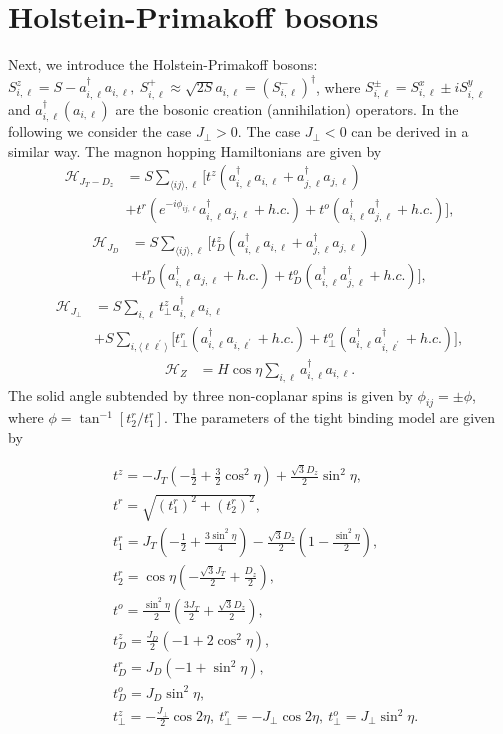 \documentclass[aps,twocolumn,amsmath,amssymb, superscriptaddress]{revtex4}
\def\dg{\dagger}
\def\lb{\left(}
\def\rb{\right)}
\def\ra{\rangle}
\def\la{\langle}
\begin{document}
\section{Holstein-Primakoff  bosons}

Next, we introduce the  Holstein-Primakoff  bosons: $
S_{i,\ell}^{z}= S-a_{i,\ell}^\dagger a_{i,\ell},~  S_{i,\ell}^{+} \approx  \sqrt{2S}a_{i,\ell}=\lb S_{i,\ell}^{-}\rb^\dg$, where $ S_{i,\ell}^{\pm}=S_{i,\ell}^{x}\pm i S_{i,\ell}^{y}$ and $a_{i,\ell}^\dagger(a_{i,\ell})$ are the bosonic creation (annihilation) operators. In the following we consider the case $J_\perp>0$. The case $J_\perp<0$ can be derived in a similar way. The magnon hopping Hamiltonians are given by
\begin{align}
\mathcal H_{J_T-D_z}&= S\sum_{\la ij\ra,\ell}\big[ t^z(a_{i,\ell}^\dg a_{i,\ell} +a_{j,\ell}^\dg a_{j,\ell}) \\&\nonumber + t^r(e^{-i\phi_{ij,\ell}}a_{i,\ell}^\dg a_{j,\ell} + h.c.)+ t^o(a_{i,\ell}^\dg a_{j,\ell}^\dg + h.c.)\big],
\end{align}
\begin{align}
\mathcal H_{J_D}&= S\sum_{\la ij\ra,\ell}\big[ t^{z}_D(a_{i,\ell}^\dg a_{i,\ell} +a_{j,\ell}^\dg a_{j,\ell}) \\&\nonumber + t^{r}_D(a_{i,\ell}^\dg a_{j,\ell} + h.c.)+ t^{o}_D(a_{i,\ell}^\dg a_{j,\ell}^\dg + h.c.)\big],
\end{align}
 \begin{align}
\mathcal H_{J_\perp}&= S\sum_{i,\ell} t_\perp^za_{i,\ell}^\dg a_{i,\ell}  \\&\nonumber + S\sum_{i,\la \ell\ell^\prime\ra}\big[ t_\perp^r(a_{i,\ell}^\dg a_{i,\ell^\prime} + h.c.) + t_\perp^o(a_{i,\ell}^\dg a_{i,\ell^\prime}^\dg + h.c.)\big],
\end{align}
\begin{align}
\mathcal H_{Z}&=H\cos\eta\sum_{i,\ell}a_{i,\ell}^\dg a_{i,\ell}.
\end{align}
   The  solid angle subtended by three non-coplanar spins  is given by $\phi_{ij}=\pm\phi$, where $\phi=\tan^{-1}[t_{2}^r/t_{1}^r]$. The parameters of the tight binding model are given by 

\begin{align}
&t^z= -J_T\lb -\frac{1}{2}+\frac{3}{2}\cos^2\eta\rb+\frac{ \sqrt{3}D_z}{2}\sin^2\eta,\\
&t^r=\sqrt{(t_1^r)^2+(t_2^r)^2},\\
&t_1^r= J_T\lb-\frac{1}{2} +\frac{3\sin^2\eta}{4}\rb-\frac{\sqrt{3}D_z}{2}\lb 1-\frac{\sin^2\eta}{2}\rb,\\
&t_2^r= \cos\eta\lb -\frac{\sqrt{3}J_T}{2}+\frac{D_z}{2}\rb,\\
&t^{o}=\frac{\sin^2\eta}{2}\lb \frac{3J_T}{2}+\frac{\sqrt{3}D_z}{2}\rb,\\
&t^{z}_D= \frac{J_D}{2}\lb -1+2\cos^2\eta\rb,\\
&t^r_D= J_D\lb-1 +\sin^2\eta\rb,\\
& t^{o}_D=J_D\sin^2\eta,\\
& t_\perp^z= -\frac{J_{\perp}}{2}\cos 2\eta,~
t_\perp^r=-  J_{\perp}\cos 2\eta,~
t_\perp^o=J_{\perp} \sin^2\eta.
\end{align}
\end{document}
